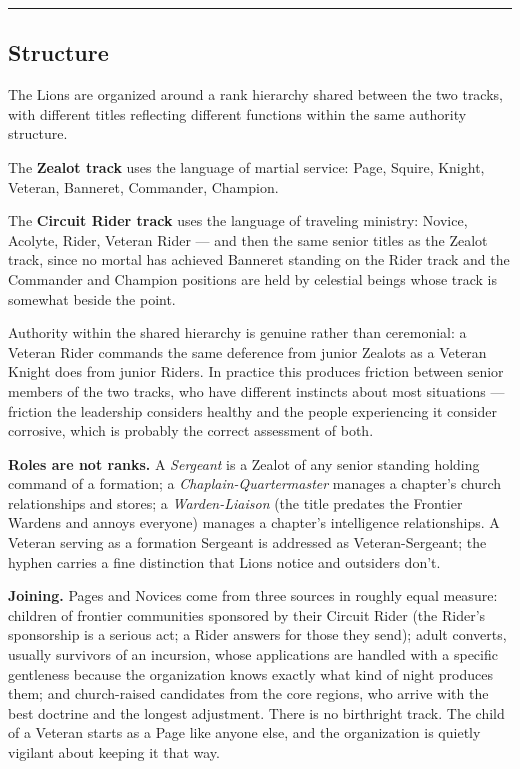 \medskip\hrule\medskip

\subsection{Structure}

The Lions are organized around a rank hierarchy shared between the two tracks, with different titles reflecting different functions within the same authority structure.

The \textbf{Zealot track} uses the language of martial service: Page, Squire, Knight, Veteran, Banneret, Commander, Champion.

The \textbf{Circuit Rider track} uses the language of traveling ministry: Novice, Acolyte, Rider, Veteran Rider --- and then the same senior titles as the Zealot track, since no mortal has achieved Banneret standing on the Rider track and the Commander and Champion positions are held by celestial beings whose track is somewhat beside the point.

Authority within the shared hierarchy is genuine rather than ceremonial: a Veteran Rider commands the same deference from junior Zealots as a Veteran Knight does from junior Riders. In practice this produces friction between senior members of the two tracks, who have different instincts about most situations --- friction the leadership considers healthy and the people experiencing it consider corrosive, which is probably the correct assessment of both.

\textbf{Roles are not ranks.} A \textit{Sergeant} is a Zealot of any senior standing holding command of a formation; a \textit{Chaplain-Quartermaster} manages a chapter's church relationships and stores; a \textit{Warden-Liaison} (the title predates the Frontier Wardens and annoys everyone) manages a chapter's intelligence relationships. A Veteran serving as a formation Sergeant is addressed as Veteran-Sergeant; the hyphen carries a fine distinction that Lions notice and outsiders don't.

\textbf{Joining.} Pages and Novices come from three sources in roughly equal measure: children of frontier communities sponsored by their Circuit Rider (the Rider's sponsorship is a serious act; a Rider answers for those they send); adult converts, usually survivors of an incursion, whose applications are handled with a specific gentleness because the organization knows exactly what kind of night produces them; and church-raised candidates from the core regions, who arrive with the best doctrine and the longest adjustment. There is no birthright track. The child of a Veteran starts as a Page like anyone else, and the organization is quietly vigilant about keeping it that way.

